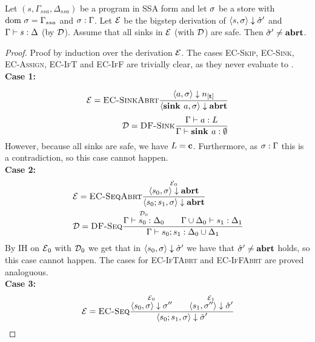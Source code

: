 \begin{lemma}
    \label{lem:df-soundness}
    Let $(s, \Gamma_{ssa}, \Delta_{ssa})$ be a program in SSA form and let $\sigma$ be a store
    with $\text{dom }{\sigma} = \Gamma_{ssa}$ and ${\sigma}:{\Gamma}$.
    Let $\operatorname{\mathcal{E}}$ be the bigstep derivation of $\langle s, \sigma \rangle \downarrow \hat{\sigma}{}'$
    and $\Gamma \vdash {s}: \Delta$ (by $\operatorname{\mathcal{D}}$).
    Assume that all sinks in $\operatorname{\mathcal{E}}$ (with $\operatorname{\mathcal{D}}$) are safe.
    Then $\hat{\sigma}{}' \neq \textbf{abrt}$.
\end{lemma}
\begin{proof}
    Proof by induction over the derivation $\operatorname{\mathcal{E}}$.
    The cases \textsc{EC-Skip}, \textsc{EC-Sink}, \textsc{EC-Assign}, \textsc{EC-IfT} and \textsc{EC-IfF}
    are trivially clear, as they never evaluate to \exception.\\
    \textbf{Case 1:}
    \begin{align*}
        \E = \bsrule{EC-SinkAbrt}{\overset{}{\bigstep{a}{\store}{\tracked{}}}}
        {\bigstep{\defaultsink}{\store}{\exception}}\\
        \D = \trule{DF-Sink}{\overset{}{\typestep{\Gamma}{a}{L}}}
        {\typestep{\Gamma}{\sink{a}}{\emptyset}}
    \end{align*}
    However, because all sinks are safe, we have $L = \textbf{c}$.
    Furthermore, as $\sigma : \Gamma$ this is a contradiction,
    so this case cannot happen.\\
    \textbf{Case 2:}
    \begin{align*}
        &\operatorname{\mathcal{E}} = \textsc{EC-SeqAbrt}\frac{\displaystyle \overset{\operatorname{\mathcal{E}}_0}{\langle s_0, \sigma \rangle \downarrow \textbf{abrt}}}{\displaystyle \langle {s_0}; {s_1}, \sigma \rangle \downarrow \textbf{abrt}}\\
        &\operatorname{\mathcal{D}} = \textsc{DF-Seq}\frac{\displaystyle \overset{\operatorname{\mathcal{D}}_0}{\Gamma \vdash {s_0}: \Delta_0}\qquad
        \overset{}{\Gamma \cup \Delta_0 \vdash {s_1}: \Delta_1}}{\displaystyle \Gamma \vdash {{s_0}; {s_1}}: \Delta_0 \cup \Delta_1}
    \end{align*}
    By IH on $\operatorname{\mathcal{E}}_0$ with $\operatorname{\mathcal{D}}_0$ we get that in $\langle s_0, \sigma \rangle \downarrow \hat{\sigma}{}'$ 
    we have that $\hat{\sigma}{}' \neq \textbf{abrt}$ holds, so this case cannot happen.
    The cases for \textsc{EC-IfTAbrt} and \textsc{EC-IfFAbrt} are proved analoguous.\\
    \textbf{Case 3:}
    \begin{align*}
        &\E = \bsrule{EC-Seq}{\overset{\E_0}{\bigstep{s_0}{\sigma}{\store''}} \qquad 
        \overset{\E_1}{\bigstep{s_1}{\store''}{\excstore'}}}
        {\bigstep{\defaultssaseq}{\store}{\excstore'}}\\    

\end{align*}
\end{proof}
